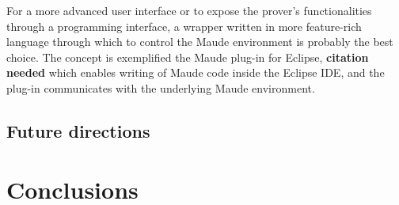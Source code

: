 \documentclass[12pt,a4paper]{article}
\begin{document}
For a more advanced user interface or to expose the prover's functionalities through a programming interface, a wrapper written in more feature-rich language through which to control the Maude environment is probably the best choice. The concept is exemplified the Maude plug-in for Eclipse, \textbf{citation needed} which enables writing of Maude code inside the Eclipse IDE, and the plug-in communicates with the underlying Maude environment.
\subsection{Future directions}

\section{Conclusions}

\pagebreak


\end{document}
